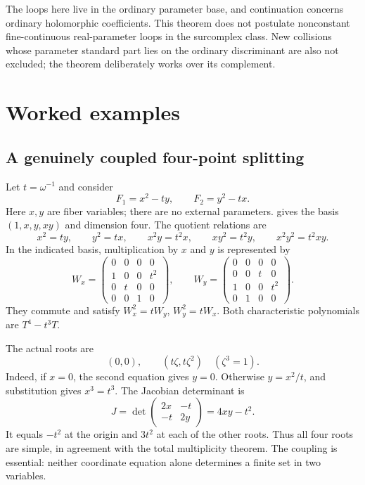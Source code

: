 \documentclass[11pt,oneside]{article}
\numberwithin{equation}{section}
\theoremstyle{definition}
\theoremstyle{remark}\newtheorem{remark}[theorem]{Remark}
\begin{document}
The loops here live in the ordinary parameter base, and continuation concerns ordinary holomorphic coefficients. This theorem does not postulate nonconstant fine-continuous real-parameter loops in the surcomplex class. New collisions whose parameter standard part lies on the ordinary discriminant are also not excluded; the theorem deliberately works over its complement.

\section{Worked examples}\label{sec:examples}
\subsection{A genuinely coupled four-point splitting}\label{subsec:fourpoints}
Let \(t=\omega^{-1}\) and consider
\begin{equation}\label{eq:fourpointssystem}
 F_1=x^2-ty,\qquad F_2=y^2-tx.
\end{equation}
Here \(x,y\) are fiber variables; there are no external parameters.  gives the basis \((1,x,y,xy)\) and dimension four. The quotient relations are
\[
 x^2=ty,\qquad y^2=tx,\qquad
 x^2y=t^2x,\qquad xy^2=t^2y,\qquad x^2y^2=t^2xy.
\]
In the indicated basis, multiplication by \(x\) and \(y\) is represented by
\begin{equation}\label{eq:fourpointsmatrices}
 W_x=\begin{pmatrix}
 0&0&0&0\\1&0&0&t^2\\0&t&0&0\\0&0&1&0
 \end{pmatrix},\qquad
 W_y=\begin{pmatrix}
 0&0&0&0\\0&0&t&0\\1&0&0&t^2\\0&1&0&0
 \end{pmatrix}.
\end{equation}
They commute and satisfy \(W_x^2=tW_y\), \(W_y^2=tW_x\). Both characteristic polynomials are \(T^4-t^3T\).

The actual roots are
\begin{equation}\label{eq:fourpointsroots}
 (0,0),\qquad(t\zeta,t\zeta^2)\quad(\zeta^3=1).
\end{equation}
Indeed, if \(x=0\), the second equation gives \(y=0\). Otherwise \(y=x^2/t\), and substitution gives \(x^3=t^3\). The Jacobian determinant is
\[
 J=\det\begin{pmatrix}2x&-t\\-t&2y\end{pmatrix}=4xy-t^2.
\]
It equals \(-t^2\) at the origin and \(3t^2\) at each of the other roots. Thus all four roots are simple, in agreement with the total multiplicity theorem. The coupling is essential: neither coordinate equation alone determines a finite set in two variables.
\end{document}
